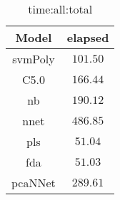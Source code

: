 \begin{table}[!ht]
	\centering
	\begin{tabular}{|c|c|}
		\hline
		Model & elapsed \\ \hline
		svmPoly & $101.50$ \\ \hline
		C5.0 & $166.44$ \\ \hline
		nb & $190.12$ \\ \hline
		nnet & $486.85$ \\ \hline
		pls & $51.04$ \\ \hline
		fda & $51.03$ \\ \hline
		pcaNNet & $289.61$ \\ \hline
	\end{tabular}
	\caption{time:all:total}
	\label{tab:time:all:total}
\end{table}
